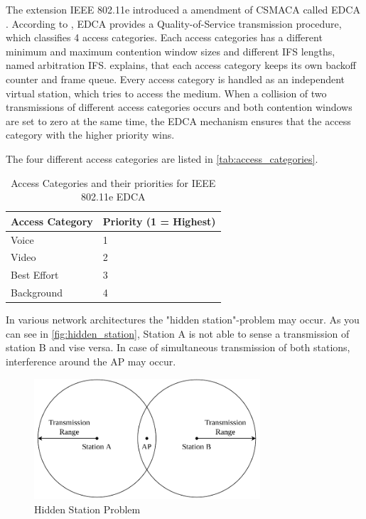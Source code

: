 The extension IEEE 802.11e introduced a amendment of \ac{CSMACA} called \ac{EDCA} \cite{sommer_vehicular_2014} \cite{wu_ieee_2006}.
According to \textcite{sommer_vehicular_2014}, \ac{EDCA} provides a Quality-of-Service transmission procedure, which classifies \num{4} access categories.
Each access categories has a different minimum and maximum contention window sizes and different \ac{IFS} lengths, named
arbitration \ac{IFS}.
\textcite{wu_ieee_2006} explains, that each access category keeps its own backoff counter and frame queue.
Every access category is handled as an independent virtual station, which tries to access the medium.
When a collision of
two transmissions of different access categories occurs and both contention windows are set to zero at the same time,
the \ac{EDCA} mechanism ensures that the access category with the higher priority wins.

The four different access categories are listed in \autoref{tab:access_categories}.

\begin{table}[!ht]
	\centering
	\begin{tabular}{>{\raggedright}p{2.5cm}p{3.2cm}}
		\toprule
		Access Category & Priority (1 = Highest)\\
		\midrule
		Voice & 1 \\
		Video & 2 \\
		Best Effort & 3 \\
		Background & 4 \\
		\bottomrule
	\end{tabular}
	\caption{Access Categories and their priorities for IEEE 802.11e \ac{EDCA} \cite{wu_ieee_2006}}
	\label{tab:access_categories}
\end{table}



In various network architectures the "hidden station"-problem may occur.
As you can see in \autoref{fig:hidden_station}, Station A is not able to sense a transmission of station B and vise versa.
In case of simultaneous transmission of both stations, interference around the \ac{AP} may occur.
\begin{figure}%
	\centering
	\includegraphics[width=0.75\textwidth]{figures/hidden_station.pdf}
	\caption{Hidden Station Problem}%
	\label{fig:hidden_station}%
\end{figure}


